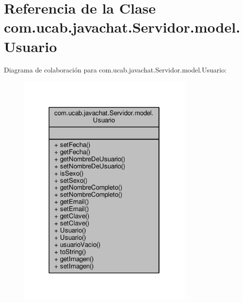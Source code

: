 \hypertarget{classcom_1_1ucab_1_1javachat_1_1_servidor_1_1model_1_1_usuario}{\section{Referencia de la Clase com.\-ucab.\-javachat.\-Servidor.\-model.\-Usuario}
\label{classcom_1_1ucab_1_1javachat_1_1_servidor_1_1model_1_1_usuario}
}


Diagrama de colaboración para com.\-ucab.\-javachat.\-Servidor.\-model.\-Usuario\-:
\nopagebreak
\begin{figure}[H]
\begin{center}
\leavevmode
\includegraphics[width=250pt]{dd/d58/classcom_1_1ucab_1_1javachat_1_1_servidor_1_1model_1_1_usuario__coll__graph}
\end{center}
\end{figure}
